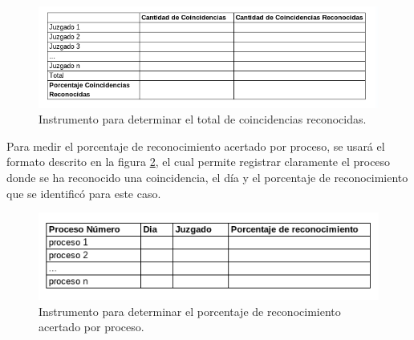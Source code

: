 \paragraph{}

\begin{figure}[h]
\begin{center}
\includegraphics[scale=0.7]{./porcentaje_coincidencias.png}
\end{center}
{\caption{Instrumento para determinar el total de coincidencias reconocidas.}\label{fig:coincidencias}}
\end{figure}

Para medir el porcentaje de reconocimiento acertado por proceso, se 
usar\'a el formato descrito en la figura \ref{fig:coincidencias_por_proceso}, el cual permite registrar 
claramente el proceso donde se ha reconocido una coincidencia, el d\'ia y
el porcentaje de reconocimiento que se identific\'o para este caso.

\begin{figure}[h]
\begin{center}
\includegraphics[scale=0.7]{./porcentaje_coincidencias_por_proceso.png}
\end{center}
{\caption{Instrumento para determinar el porcentaje de reconocimiento acertado por proceso.}\label{fig:coincidencias_por_proceso}}
\end{figure}

\clearpage
\pagebreak